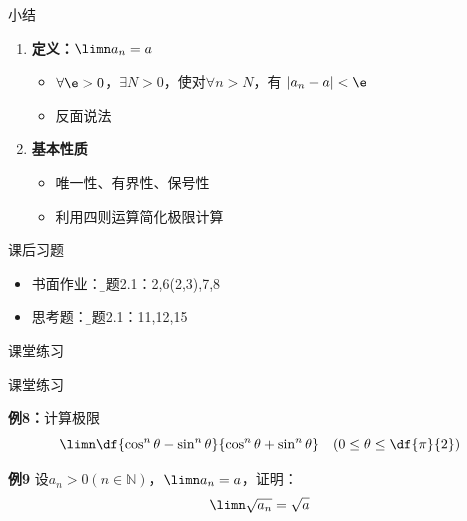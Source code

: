 \begin{frame}[<+->]{小结}
	\linespread{1.5}
	\begin{enumerate}
	  \item {\bf 定义：$\limn a_n=a$}
	  \begin{itemize}
	    \item $\forall\e>0$，$\exists N>0$，使对$\forall n>N$，有
		$|a_n-a|<\e$
		\item 反面说法
	  \end{itemize}
	  \item {\bf 基本性质}
	  \begin{itemize}
	    \item 唯一性、有界性、保号性
	    \item 利用四则运算简化极限计算
	  \end{itemize}
	\end{enumerate}
	\pause
	\pause
	\begin{exampleblock}{课后习题}
	  \begin{itemize}
	    \item 书面作业：{\b 习题2.1：2,6(2,3),7,8}
	    \item 思考题：{\b 习题2.1：11,12,15}
	  \end{itemize}
	\end{exampleblock}
\end{frame}

\begin{frame}{课堂练习}
	\linespread{1.5}
\end{frame}

\begin{frame}{课堂练习}
	\linespread{1.5}
	\begin{exampleblock}{{\bf 例8：}计算极限\hfill }
		$$\limn\df{\cos^n\theta-\sin^n\theta}{\cos^n\theta+\sin^n\theta}\quad
	  	(0\leq\theta\leq\df{\pi}{2})$$
	\end{exampleblock}
	\bigskip
	\pause
	\begin{exampleblock}{{\bf 例9}\hfill }
		设$a_n>0(n\in\mathbb{N})$，$\limn a_n=a$，证明：
		$$\limn\sqrt{a_n}=\sqrt a$$
	\end{exampleblock}
\end{frame}

